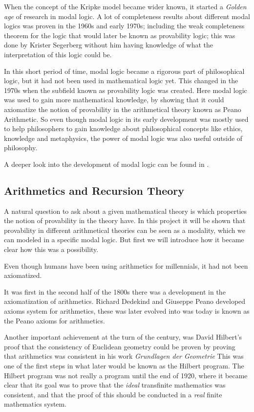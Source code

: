 \documentclass[../main.tex]{subfiles}
\begin{document}
When the concept of the Kripke model became wider known, it started a
\textit{Golden age} of research in modal logic. A lot of completeness results
about different modal logics was proven in the 1960s and early 1970s; including
the weak completeness theorem for the logic that would later be known as
provability logic; this was done by Krister Segerberg without him having
knowledge of what the interpretation of this logic could be.

In this short period of time, modal logic became a rigorous part of
philosophical logic, but it had not been used in mathematical logic yet. This
changed in the 1970s when the subfield known as provability logic was created.
Here modal logic was used to gain more mathematical knowledge, by showing that
it could axiomatize the notion of provability in the arithmetical theory known
as Peano Arithmetic. So even though modal logic in its early development was
mostly used to help philosophers to gain knowledge about philosophical concepts
like ethics, knowledge and metaphysics, the power of modal logic was also
useful outside of philosophy.

A deeper look into the development of modal logic can be found in
\parencite{Goldblatt2003}.
\subsection{Arithmetics and Recursion Theory}
A natural question to ask about a given mathematical theory is which properties
the notion of provability in the theory have. In this project it will be shown
that provability in different arithmetical theories  can be seen as a modality,
which we can modeled in a specific
modal logic. But first we will introduce how it became clear how this was a
possibility.

Even though humans have been using arithmetics for millennials, it had not been
axiomatized.

It was first in  the second half of the 1800s there was a development in the axiomatization
of arithmetics. Richard Dedekind and Giuseppe Peano developed axioms system for arithmetics,
these was later evolved into was today is known as the Peano axioms for
arithmetics. 

Another important achievement at the turn of the century, was David Hilbert's
proof that the consistency of Euclidean geometry could be proven by proving
that arithmetics was consistent in his work  \textit{Grundlagen der Geometrie} This was one of the first steps in what later
would be known as the Hilbert program. 
The Hilbert program was not really a program until the end of 1920, where it
became clear that its goal was to prove that the \textit{ideal} transfinite mathematics was
consistent, and that the proof of this should be conducted in a \textit{real}
finite mathematics system.
\end{document}
